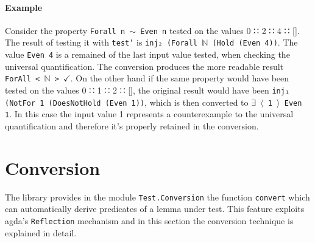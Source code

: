 \documentclass[10pt,a4paper]{article}
\begin{document}
\paragraph{Example} 
Consider the property \texttt{Forall n $\sim$ Even n} tested on the values 0 ∷ 2 ∷ 4 ∷ []. The result of testing it with \texttt{test'} is \texttt{\texttt{inj₂} (Forall $\mathbb{N}$ (Hold (Even 4))}. The value \texttt{Even 4} is a remained of the last input value tested, when checking the universal quantification. The conversion produces the more readable result 
\texttt{ForAll < $\mathbb{N}$ > $\checkmark$}.
On the other hand if the same property would have been tested on the values 0 ∷ 1 ∷ 2 ∷ [], the original result would have been \texttt{\texttt{inj₁} (NotFor 1 (DoesNotHold (Even 1))}, which is then converted to \texttt{$\exists$ $\langle$ 1 $\rangle$ Even 1}. In this case the input value 1 represents a counterexample to the universal quantification and therefore it's properly retained in the conversion.

\section{Conversion}
The library provides in the module \texttt{Test.Conversion} the function \texttt{convert} which can automatically derive predicates of a lemma under test. 
This feature exploits agda's \texttt{Reflection} mechanism and in this section the conversion technique is explained in detail.
\end{document}
